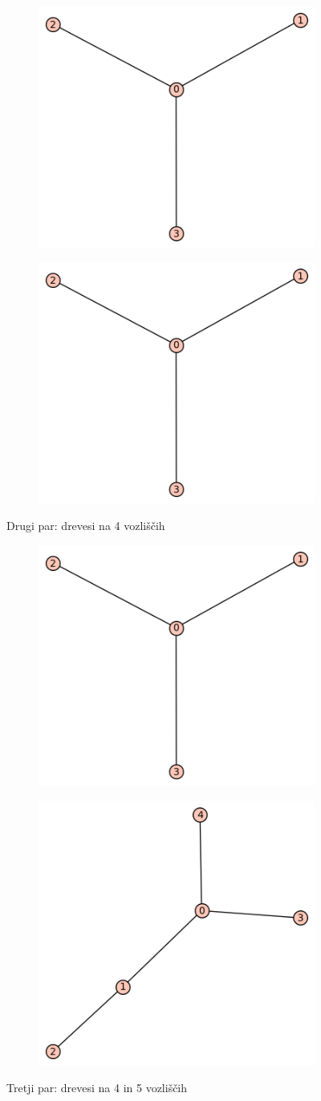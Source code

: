 \documentclass[12pt, a4paper]{article}
\begin{document}
\begin{figure}[!htb]
\centering
\begin{subfigure}{0.5\textwidth}
  \centering
  \includegraphics[width=0.4\linewidth]{t-4}
\end{subfigure}%
\begin{subfigure}{0.5\textwidth}
  \centering
  \includegraphics[width=0.4\linewidth]{t-4}
\end{subfigure}
\caption{Drugi par: drevesi na 4 vozliščih}
\label{fig:test}
\end{figure}

\begin{figure}[!htb]
\centering
\begin{subfigure}{0.5\textwidth}
  \centering
  \includegraphics[width=0.4\linewidth]{t-4}
\end{subfigure}%
\begin{subfigure}{0.5\textwidth}
  \centering
  \includegraphics[width=0.4\linewidth]{t-6}
\end{subfigure}
\caption{Tretji par: drevesi na 4 in 5 vozliščih}
\label{fig:test}
\end{figure}
\clearpage
\end{document}
